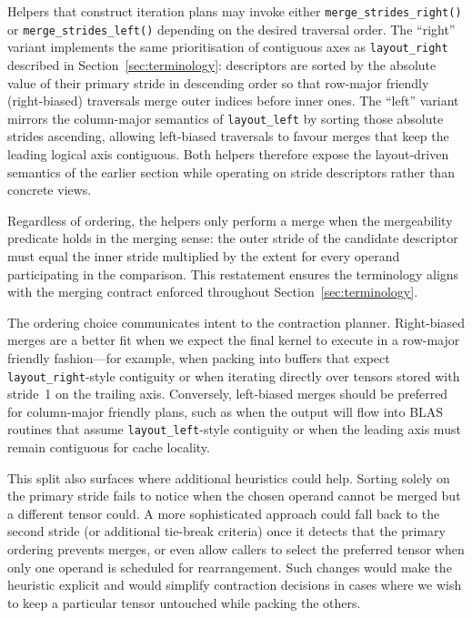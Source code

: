 \documentclass[11pt]{article}
\begin{document}
Helpers that construct iteration plans may invoke either \texttt{merge\_strides\_right()} or
\texttt{merge\_strides\_left()} depending on the desired traversal order.  The ``right'' variant
implements the same prioritisation of contiguous axes as \texttt{layout\_right} described in
Section~\ref{sec:terminology}: descriptors are sorted by the absolute value of their primary stride
in descending order so that row-major friendly (right-biased) traversals merge outer indices before
inner ones.  The ``left'' variant mirrors the column-major semantics of \texttt{layout\_left} by
sorting those absolute strides ascending, allowing left-biased traversals to favour merges that keep
the leading logical axis contiguous.  Both helpers therefore expose the layout-driven semantics of
the earlier section while operating on stride descriptors rather than concrete views.

Regardless of ordering, the helpers only perform a merge when the mergeability predicate holds in the
merging sense: the outer stride of the candidate descriptor must equal the inner stride multiplied by
the extent for every operand participating in the comparison.  This restatement ensures the
terminology aligns with the merging contract enforced throughout Section~\ref{sec:terminology}.

The ordering choice communicates intent to the contraction planner.  Right-biased merges are a better
fit when we expect the final kernel to execute in a row-major friendly fashion---for example, when
packing into buffers that expect \texttt{layout\_right}-style contiguity or when iterating directly
over tensors stored with stride~1 on the trailing axis.  Conversely, left-biased merges should be
preferred for column-major friendly plans, such as when the output will flow into BLAS routines that
assume \texttt{layout\_left}-style contiguity or when the leading axis must remain contiguous for
cache locality.

This split also surfaces where additional heuristics could help.  Sorting solely on the primary
stride fails to notice when the chosen operand cannot be merged but a different tensor could.  A
more sophisticated approach could fall back to the second stride (or additional tie-break criteria)
once it detects that the primary ordering prevents merges, or even allow callers to select the
preferred tensor when only one operand is scheduled for rearrangement.  Such changes would make
the heuristic explicit and would simplify contraction decisions in cases where we wish to keep a
particular tensor untouched while packing the others.
\end{document}
